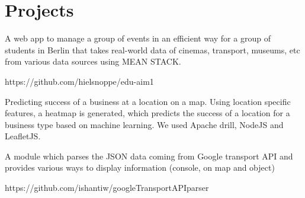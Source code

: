 \documentclass[]{hieudo-build}
\begin{document}
\begin{minipage}[t]{0.65\textwidth}
\section{Projects}
\descript{}
A web app to manage a group of events in an efficient way for a group of students in Berlin that takes real-world data of cinemas, transport, museums, etc from various data sources using MEAN STACK.

https://github.com/hielsnoppe/edu-aim1

\sectionsep

\descript{}
Predicting success of a business at a location on a map.  Using location specific features, a heatmap is generated, which predicts the success of a location for a business type based on machine learning. We used Apache drill, NodeJS and LeafletJS.
\sectionsep 

\descript{}
A module which parses the JSON data coming from Google transport API and provides various ways to display information (console, on map and object)

https://github.com/ishantiw/googleTransportAPIparser
\sectionsep



\end{minipage} 
\end{document}

